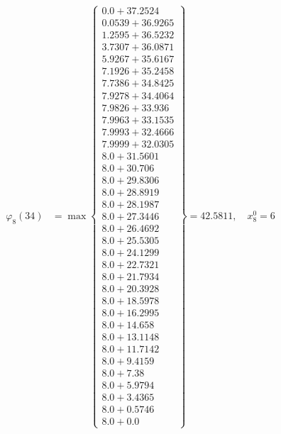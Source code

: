 \documentclass{article}
\begin{document}
\begin{align*}
\varphi_{8}(34) &= \max \left\{ \begin{array}{c}
0.0 + 37.2524 \\
 0.0539 + 36.9265 \\
 1.2595 + 36.5232 \\
 3.7307 + 36.0871 \\
 5.9267 + 35.6167 \\
 7.1926 + 35.2458 \\
 7.7386 + 34.8425 \\
 7.9278 + 34.4064 \\
 7.9826 + 33.936 \\
 7.9963 + 33.1535 \\
 7.9993 + 32.4666 \\
 7.9999 + 32.0305 \\
 8.0 + 31.5601 \\
 8.0 + 30.706 \\
 8.0 + 29.8306 \\
 8.0 + 28.8919 \\
 8.0 + 28.1987 \\
 8.0 + 27.3446 \\
 8.0 + 26.4692 \\
 8.0 + 25.5305 \\
 8.0 + 24.1299 \\
 8.0 + 22.7321 \\
 8.0 + 21.7934 \\
 8.0 + 20.3928 \\
 8.0 + 18.5978 \\
 8.0 + 16.2995 \\
 8.0 + 14.658 \\
 8.0 + 13.1148 \\
 8.0 + 11.7142 \\
 8.0 + 9.4159 \\
 8.0 + 7.38 \\
 8.0 + 5.9794 \\
 8.0 + 3.4365 \\
 8.0 + 0.5746 \\
 8.0 + 0.0
\end{array} \right\}=42.5811, \quad x_{8}^0=6\\
  

\end{align*}
\end{document}
